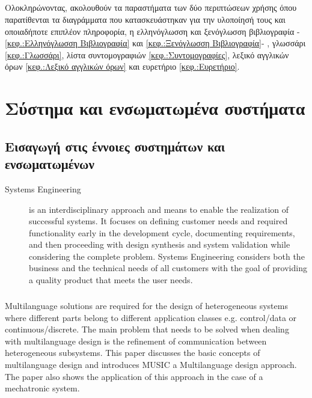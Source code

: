 \documentclass[a4paper,12pt,twoside]{report}
\begin{document}
		\paragraph{} {Ολοκληρώνοντας, ακολουθούν τα παραστήματα των δύο περιπτώσεων χρήσης όπου παρατίθενται τα διαγράμματα που κατασκευάστηκαν για την υλοποίησή τους και οποιαδήποτε επιπλέον πληροφορία, η ελληνόγλωσση και ξενόγλωσση βιβλιογραφία -\ref{κεφ.:Ελληνόγλωσση Βιβλιογραφία} και \ref{κεφ.:Ξενόγλωσση Βιβλιογραφία}- , γλωσσάρι \ref{κεφ.:Γλωσσάρι}, λίστα συντομογραφιών \ref{κεφ.:Συντομογραφίες}, λεξικό αγγλικών όρων \ref{κεφ.:Λεξικό αγγλικών όρων} και ευρετήριο \ref{κεφ.:Ευρετήριο}.
		}


	\chapter{Σύστημα και ενσωματωμένα συστήματα}
		\label{κεφ.:Σύστημα και ενσωματωμένα συστήματα}
	
		\section{Εισαγωγή στις έννοιες συστημάτων και ενσωματωμένων}
		
			\begin{description}
				\item [Systems Engineering] is an interdisciplinary approach and means to enable the realization of successful systems. It focuses on defining customer needs and required functionality  early in the development cycle, documenting requirements, and then proceeding with design synthesis  and system validation while considering the complete problem. Systems Engineering considers both  the business and the technical needs of all customers with the goal of providing a quality product  that meets the user needs. \cite{IncoseSEH}
			\end{description}
			
			\paragraph{} {Multilanguage solutions are required for the design of heterogeneous systems where different parts belong to different application classes e.g. control/data or continuous/discrete. The main problem that needs to be solved when dealing with multilanguage design is the refinement of communication between heterogeneous subsystems. This paper discusses the basic concepts of multilanguage design and introduces MUSIC a Multilanguage design approach. The paper also shows the application of this approach in the case of a mechatronic system. \cite{MultilanguageDesignHeterogeneousSystems}
			}
		
\end{document}
